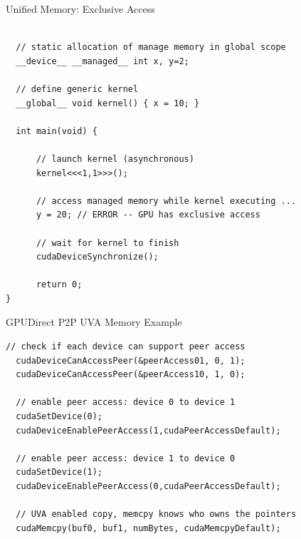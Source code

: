 \documentclass{beamer}
\begin{document}
\begin{frame}[fragile]{Unified Memory: Exclusive Access}
\begin{lstlisting}[caption={Do not do this.  The device has exclusive access to managed memory while kernel launch is active, regardless of whether the kernel references the memory accessed by the host.}]

  // static allocation of manage memory in global scope
  __device__ __managed__ int x, y=2;

  // define generic kernel
  __global__ void kernel() { x = 10; }

  int main(void) {

      // launch kernel (asynchronous)
      kernel<<<1,1>>>();

      // access managed memory while kernel executing ...
      y = 20; // ERROR -- GPU has exclusive access

      // wait for kernel to finish
      cudaDeviceSynchronize();

      return 0;
}
\end{lstlisting}
\end{frame}

\begin{frame}[fragile]{GPUDirect P2P UVA Memory Example}
\begin{lstlisting}[caption={Exchanging memory between peer devices with UVA in effect.  What makes P2P exchange special is that devices exchange data directly, effectively bypassing the host.  This feature is often referred to as ``GPUDirect P2P Transfer''.  Without P2P capabilities enabled there is an extra copy involved over PCI-e as data from the source device must be copied to the host and then copied again from the host to the destination.} ]
  // check if each device can support peer access
  cudaDeviceCanAccessPeer(&peerAccess01, 0, 1);
  cudaDeviceCanAccessPeer(&peerAccess10, 1, 0);

  // enable peer access: device 0 to device 1
  cudaSetDevice(0);  
  cudaDeviceEnablePeerAccess(1,cudaPeerAccessDefault);
  
  // enable peer access: device 1 to device 0
  cudaSetDevice(1);  
  cudaDeviceEnablePeerAccess(0,cudaPeerAccessDefault);

  // UVA enabled copy, memcpy knows who owns the pointers
  cudaMemcpy(buf0, buf1, numBytes, cudaMemcpyDefault);
\end{lstlisting}
\end{frame}
\end{document}
